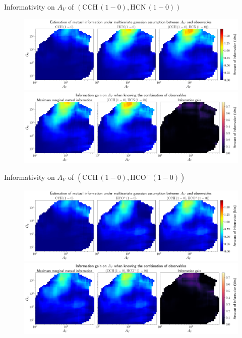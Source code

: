\documentclass{beamer}
\begin{document}
\begin{frame}{Informativity on $A_V$ of $\left(\mathrm{CCH\,(1-0)},\mathrm{HCN\,(1-0)}\right)$}
    \begin{figure}
        \centering
        \includegraphics[width=0.95\linewidth]{../linearinfogauss/av__cch10_hcn10_linearinfogauss.png}
        \vfill
        \includegraphics[width=0.95\linewidth]{../linearinfogauss/av__cch10_hcn10_linearinfogauss_gain.png}
    \end{figure}
\end{frame}

\begin{frame}{Informativity on $A_V$ of $\left(\mathrm{CCH\,(1-0)},\mathrm{HCO^+\,(1-0)}\right)$}
    \begin{figure}
        \centering
        \includegraphics[width=0.95\linewidth]{../linearinfogauss/av__cch10_hcop10_linearinfogauss.png}
        \vfill
        \includegraphics[width=0.95\linewidth]{../linearinfogauss/av__cch10_hcop10_linearinfogauss_gain.png}
    \end{figure}
\end{frame}
\end{document}
